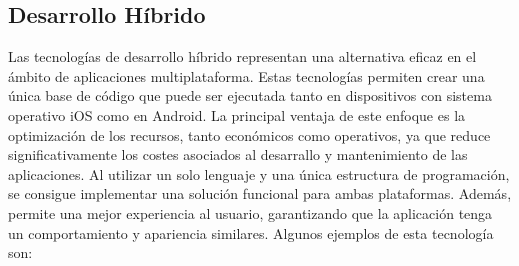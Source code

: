 \subsection{Desarrollo Híbrido}
\label{subsec:hibrido}
Las tecnologías de desarrollo híbrido representan una alternativa eficaz en el ámbito de aplicaciones multiplataforma. Estas tecnologías permiten crear una única 
base de código que puede ser ejecutada tanto en dispositivos con sistema operativo iOS como en Android. La principal ventaja de este enfoque es la optimización de los recursos,
tanto económicos como operativos, ya que reduce significativamente los costes asociados al desarrallo y mantenimiento de las aplicaciones. Al utilizar un solo lenguaje y una 
única estructura de programación, se consigue implementar una solución funcional para ambas plataformas. Además, permite una mejor experiencia al usuario, garantizando que la aplicación
tenga un comportamiento y apariencia similares. Algunos ejemplos de esta tecnología son:

